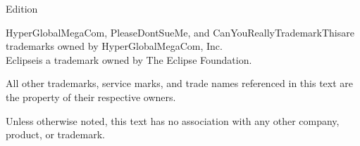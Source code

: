 
\thispagestyle{empty}
\license
\vspace{1in}
\begin{center}
Edition\\
\vspace{0.5in}
\end{center}

\vfill

{\tiny HyperGlobalMegaCom\tm, PleaseDontSueMe\tm, and CanYouReallyTrademarkThis\tm are trademarks owned by HyperGlobalMegaCom, Inc.\\
Eclipse\tm is a trademark owned by The Eclipse Foundation.

All other trademarks, service marks, and trade names referenced in this text are the property of their respective owners.

Unless otherwise noted, this text has no association with any other company, product, or trademark.} 
